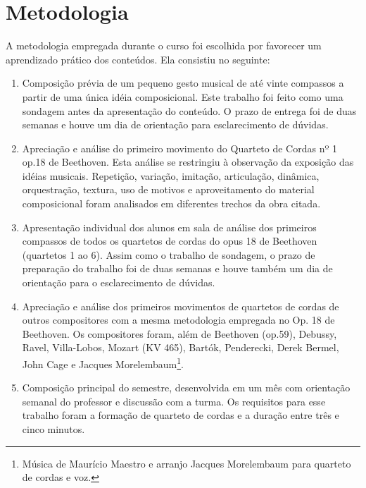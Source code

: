 \documentclass[12pt]{article}
\begin{document}
\section{Metodologia}
\label{sec:metodologia}

A metodologia empregada durante o curso foi escolhida por favorecer um
aprendizado prático dos conteúdos. Ela consistiu no seguinte:

\begin{enumerate}
\item Composição prévia de um pequeno gesto musical de até vinte
  compassos a partir de uma única idéia composicional. Este trabalho
  foi feito como uma sondagem antes da apresentação do conteúdo. O
  prazo de entrega foi de duas semanas e houve um dia de orientação
  para esclarecimento de dúvidas.
\item Apreciação e análise do primeiro movimento do Quarteto de Cordas
  nº 1 op.18 de Beethoven. Esta análise se restringiu à observação da
  exposição das idéias musicais. Repetição, variação, imitação,
  articulação, dinâmica, orquestração, textura, uso de motivos e
  aproveitamento do material composicional foram analisados em
  diferentes trechos da obra citada.
\item Apresentação individual dos alunos em sala de análise dos
  primeiros compassos de todos os quartetos de cordas do opus 18 de
  Beethoven (quartetos 1 ao 6). Assim como o trabalho de sondagem, o
  prazo de preparação do trabalho foi de duas semanas e houve também
  um dia de orientação para o esclarecimento de dúvidas.
\item Apreciação e análise dos primeiros movimentos de quartetos de
  cordas de outros compositores com a mesma metodologia empregada no
  Op. 18 de Beethoven. Os compositores foram, além de Beethoven
  (op.59), Debussy, Ravel, Villa-Lobos, Mozart (KV 465), Bartók,
  Penderecki, Derek Bermel, John Cage e Jacques
  Morelembaum\footnote{Música de Maurício Maestro e arranjo Jacques
    Morelembaum para quarteto de cordas e voz.}.

\item Composição principal do semestre, desenvolvida em um mês com
  orientação semanal do professor e discussão com a turma. Os
  requisitos para esse trabalho foram a formação de quarteto de cordas
  e a duração entre três e cinco minutos.


\end{enumerate}
\end{document}
